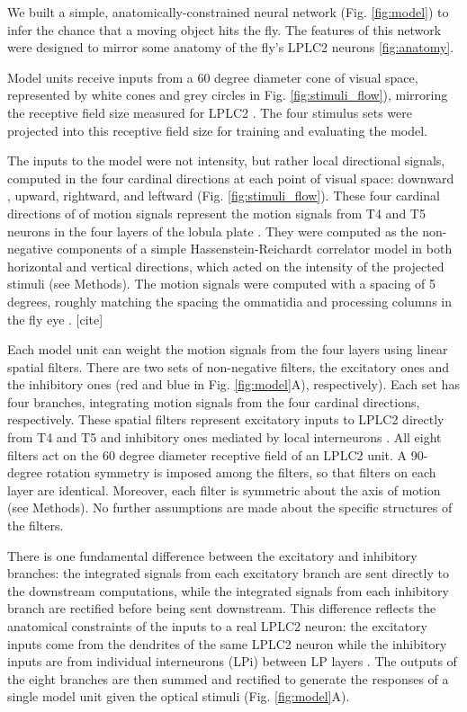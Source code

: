 \documentclass[9pt,lineno]{elife}
\begin{document}
We built a simple, anatomically-constrained neural network (Fig. \ref{fig:model}) to infer the chance that a moving object hits the fly. The features of this network were designed to mirror some anatomy of the fly's LPLC2 neurons \ref{fig:anatomy}. 

Model units receive inputs from a 60 degree diameter cone of visual space, represented by white cones and grey circles in Fig. \ref{fig:stimuli_flow}), mirroring the receptive field size measured for LPLC2 \citep{klapoetke2017ultra}. The four stimulus sets were projected into this receptive field size for training and evaluating the model.

The inputs to the model were not intensity, but rather local directional signals, computed in the four cardinal directions at each point of visual space: downward , upward, rightward, and leftward (Fig. \ref{fig:stimuli_flow}). These four cardinal directions of of motion signals represent the motion signals from T4 and T5 neurons in the four layers of the lobula plate \citep{maisak2013directional}. They were computed as the non-negative components of a simple Hassenstein-Reichardt correlator model \citep{hassenstein1956systemtheoretische} in both horizontal and vertical directions, which acted on the intensity of the projected stimuli (see Methods). The motion signals were computed with a spacing of 5 degrees, roughly matching the spacing the ommatidia and processing columns in the fly eye \citep{stavenga2003angular}. [cite]

Each model unit can weight the motion signals from the four layers using linear spatial filters. There are two sets of non-negative filters, the excitatory ones and the inhibitory ones (red and blue in Fig. \ref{fig:model}A), respectively). Each set has four branches, integrating motion signals from the four cardinal directions, respectively. These spatial filters represent excitatory inputs to LPLC2 directly from T4 and T5 and inhibitory ones mediated by local interneurons \citep{klapoetke2017ultra,mauss2015neural}. All eight filters act on the 60 degree diameter receptive field of an LPLC2 unit. A 90-degree rotation symmetry is imposed among the filters, so that filters on each layer are identical. Moreover, each filter is symmetric about the axis of motion (see Methods). No further assumptions are made about the specific structures of the filters. 

There is one fundamental difference between the excitatory and inhibitory branches: the integrated signals from each excitatory branch are sent directly to the downstream computations, while the integrated signals from each inhibitory branch are rectified before being sent downstream. This difference reflects the anatomical constraints of the inputs to a real LPLC2 neuron: the excitatory inputs come from the dendrites of the same LPLC2 neuron while the inhibitory inputs are from individual interneurons (LPi) between LP layers \citep{mauss2015neural,klapoetke2017ultra}. The outputs of the eight branches are then summed and rectified to generate the responses of a single model unit given the optical stimuli (Fig. \ref{fig:model}A). 
\end{document}
